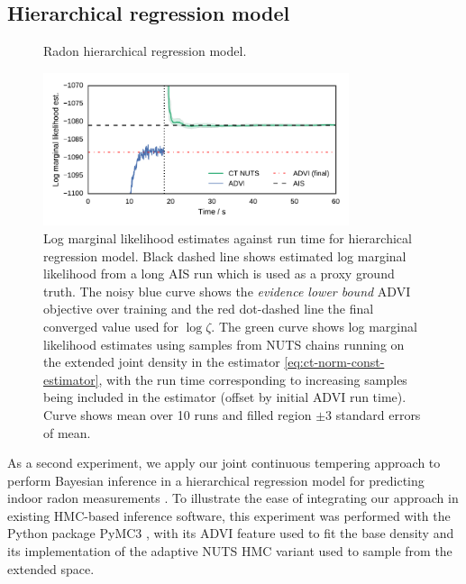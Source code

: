 \subsection{Hierarchical regression model}\label{subsec:exp-hier-regression}

\begin{figure}[h]
\centering
{}
\caption{Radon hierarchical regression model.}
\label{sfig:hier-lin-regression-factor}
\end{figure}%

\begin{figure}[h]
\centering
\vskip 0pt
\centering
\includegraphics[width=0.8\textwidth]{images/continuous-tempering/hier-lin-regression-marg-lik-t2}
\vskip 0pt
\caption[Radon model marginal likelihood estimates.]{Log marginal likelihood estimates against run time for hierarchical regression model. Black dashed line shows estimated log marginal likelihood from a long \ac{AIS} run which is used as a proxy ground truth. The noisy blue curve shows the \emph{evidence lower bound} \ac{ADVI} objective over training and the red dot-dashed line the final converged value used for $\log\zeta$. The green curve shows log marginal likelihood estimates using samples from \ac{NUTS} chains running on the extended joint density in the estimator \eqref{eq:ct-norm-const-estimator}, with the run time corresponding to increasing samples being included in the estimator (offset by initial \ac{ADVI} run time). Curve shows mean over 10 runs and filled region $\pm 3$ standard errors of mean.}
\label{fig:hier-lin-regression}
\end{figure}

As a second experiment, we apply our joint continuous tempering approach to perform Bayesian inference in a hierarchical regression model for predicting indoor radon measurements \citep{gelman2006data}. To illustrate the ease of integrating our approach in existing \ac{HMC}-based inference software, this experiment was performed with the Python package PyMC3 \citep{salvatier2016probabilistic}, with its \ac{ADVI} feature used to fit the base density and its implementation of the adaptive
\ac{NUTS} \citep{hoffman2014no} \ac{HMC} variant used to sample from the extended space.

